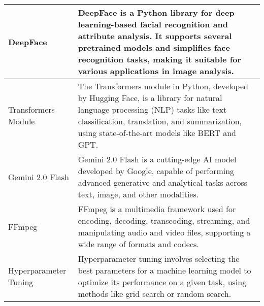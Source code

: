 \begin{center}
\begin{tabular}{|p{4cm}|p{10cm}|}
  \hline
  DeepFace & DeepFace is a Python library for deep learning-based facial recognition and attribute analysis. It supports several pretrained models and simplifies face recognition tasks, making it suitable for various applications in image analysis. \\

  \hline
  Transformers Module & The Transformers module in Python, developed by Hugging Face, is a library for natural language processing (NLP) tasks like text classification, translation, and summarization, using state-of-the-art models like BERT and GPT. \\

  \hline
  Gemini 2.0 Flash & Gemini 2.0 Flash is a cutting-edge AI model developed by Google, capable of performing advanced generative and analytical tasks across text, image, and other modalities. \\

  \hline
  FFmpeg & FFmpeg is a multimedia framework used for encoding, decoding, transcoding, streaming, and manipulating audio and video files, supporting a wide range of formats and codecs. \\

  \hline
  Hyperparameter Tuning & Hyperparameter tuning involves selecting the best parameters for a machine learning model to optimize its performance on a given task, using methods like grid search or random search. \\
  \hline
\end{tabular}
  
\end{center}


